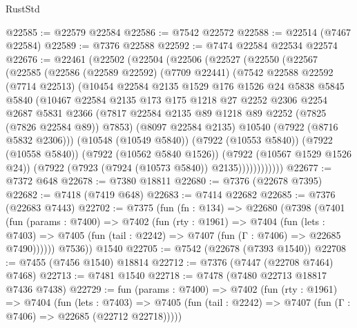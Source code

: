 \begin{lexlean}{RustStd}
\begin{coremodule}
@22585 := @22579 @22584
@22586 := @7542 @22572
@22588 := @22514 (@7467 @22584)
@22589 := @7376 @22588
@22592 := @7474 @22584 @22534 @22574
@22676 := @22461
    (@22502
      (@22504
        (@22506
          (@22527
            (@22550
              (@22567
                (@22585
                  (@22586
                    (@22589 @22592)
                    (@7709 @22441)
                    (@7542
                      @22588
                      @22592
                      (@7714 @22513)
                      (@10454
                        @22584
                        @2135
                        @1529
                        @176
                        @1526
                        @24
                        @5838
                        @5845
                        @5840
                        (@10467
                          @22584
                          @2135
                          @173
                          @175
                          @1218
                          @27
                          @2252
                          @2306
                          @2254
                          @2687
                          @5831
                          @2366
                          (@7817 @22584 @2135 @89 @1218 @89 @2252 (@7825 (@7826 @22584 @89)) @7853)
                          (@8097 @22584 @2135)
                          @10540
                          (@7922 (@8716 @5832 @2306)))
                        (@10548 (@10549 @5840))
                        (@7922 (@10553 @5840))
                        (@7922 (@10558 @5840))
                        (@7922 (@10562 @5840 @1526))
                        (@7922 (@10567 @1529 @1526 @24))
                        (@7922 (@7923 (@7924 (@10573 @5840)) @2135))))))))))))
@22677 := @7372 @648
@22678 := @7380 @18811
@22680 := @7376 (@22678 @7395)
@22682 := @7418 (@7419 @648)
@22683 := @7414 @22682
@22685 := @7376 (@22683 @7443)
@22702 := @7375
    (fun (fn : @134) =>
    @22680
      (@7398
        (@7401
          (fun (params : @7400) =>
          @7402
            (fun (rty : @1961) =>
            @7404
              (fun (lets : @7403) =>
              @7405 (fun (tail : @2242) => @7407 (fun (Γ : @7406) => @22685 @7490))))))
        @7536))
    @1540
@22705 := @7542 (@22678 (@7393 @1540))
@22708 := @7455 (@7456 @1540) @18814
@22712 := @7376 (@7447 (@22708 @7464) @7468)
@22713 := @7481 @1540
@22718 := @7478 (@7480 @22713 @18817 @7436 @7438)
@22729 := fun (params : @7400) =>
  @7402
    (fun (rty : @1961) =>
    @7404
      (fun (lets : @7403) =>
      @7405 (fun (tail : @2242) => @7407 (fun (Γ : @7406) => @22685 (@22712 @22718)))))

\end{coremodule}
\end{lexlean}
